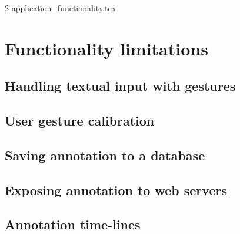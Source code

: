 {2-application_functionality.tex}

\section{Functionality limitations}

\subsection{Handling textual input with gestures}

\subsection{User gesture calibration}

\subsection{Saving annotation to a database}

\subsection{Exposing annotation to web servers}

\subsection{Annotation time-lines}


% 
% 
% 

